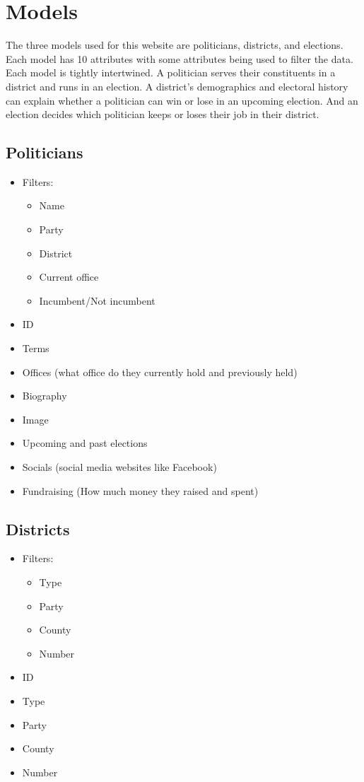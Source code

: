 \documentclass[11t]{article}
\begin{document}
\section{Models}
The three models used for this website are politicians, districts, and elections. Each model has 10 attributes with some attributes being used to filter the data. Each model is tightly intertwined. A politician serves their constituents in a district and runs in an election. A district’s demographics and electoral history can explain whether a politician can win or lose in an upcoming election. And an election decides which politician keeps or loses their job in their district.

\subsection{Politicians}
\begin{itemize}
    \item Filters:
    \begin{itemize}
        \item Name
        \item Party 
        \item District
        \item Current office 
        \item Incumbent/Not incumbent
    \end{itemize}
    \item ID
    \item Terms 
    \item Offices (what office do they currently hold and previously held)
    \item Biography 
    \item Image
    \item Upcoming and past elections
    \item Socials (social media websites like Facebook)
    \item Fundraising (How much money they raised and spent)
\end{itemize}

\subsection{Districts}
\begin{itemize}
    \item Filters:
    \begin{itemize}
        \item Type
        \item Party
        \item County
        \item Number
    \end{itemize}
    \item ID
    \item Type
    \item Party
    \item County
    \item Number
\end{itemize}
\end{document}
